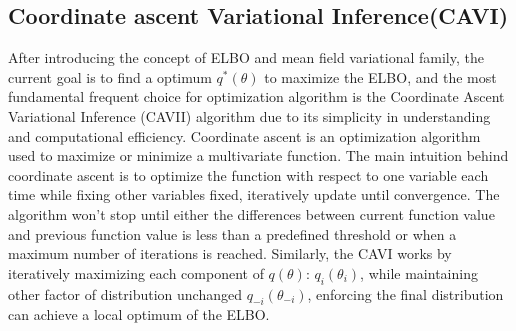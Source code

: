 \subsection{Coordinate ascent Variational Inference(CAVI)}
After introducing the concept of ELBO and mean field variational family, the current goal is to find a optimum $q^*(\theta)$ to maximize the ELBO, and the most fundamental frequent choice for optimization algorithm is the Coordinate Ascent Variational Inference (CAVII) algorithm due to its simplicity in understanding and computational efficiency. Coordinate ascent is an optimization algorithm used to maximize or minimize a multivariate function. The main intuition behind coordinate ascent is to optimize the function with respect to one variable each time while fixing other variables fixed, iteratively update until convergence. The algorithm won't stop until either the differences between current function value and previous function value is less than a predefined threshold or when a maximum number of iterations is reached.
Similarly, the CAVI works by iteratively maximizing  each component of $q(\theta)$: $q_i(\theta_i)$, while maintaining other factor of distribution unchanged $q_{-i}(\theta_{-i})$, enforcing the final distribution can achieve a local optimum of the ELBO. 
